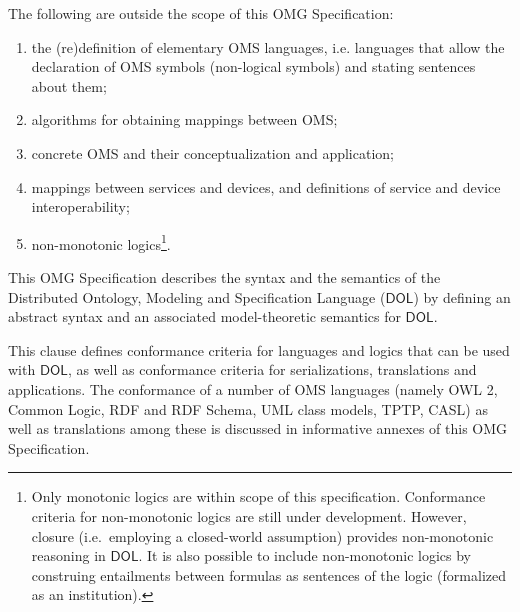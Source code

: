 \documentclass[10pt, a4paper]{isov2}
\makeatletter
\newcommand*{\ie}{i.e.\@\xspace}
\newcommand*\CommentAuthor{}
\renewcommand*\CommentAuthor{#1}}
\newcommand*\CommentDate{}
\renewcommand*\CommentDate{#1}}
\newcommand*\CommentId{}
\renewcommand*\CommentId{#1}}
\newcommand*\CommentType{}
\renewcommand*\CommentType{#1}}
\newcommand*{\SetCommentColorByType}[1]{%
\edef\localType{{#1}}%
\expandafter\ifstrequal\localType{q-aut}{\colorlet{CommentColor}{red}}{%
\expandafter\ifstrequal\localType{q-all}{\colorlet{CommentColor}{orange}}{%
\expandafter\ifstrequal\localType{todo}{\colorlet{CommentColor}{orange}}{%
\expandafter\ifstrequal\localType{fyi}{\colorlet{CommentColor}{lightgray}}{%
\colorlet{CommentColor}{yellow}}}}}}
\newcommand*{\SetCommentPrefixByType}[1]{%
\edef\localType{{#1}}%
\expandafter\@ifmtarg\localType{%
\edef\CommentPrefix{}%
}{%
\caseupper[q]{#1}%
\edef\CommentPrefix{\thestring: }%
}}
\newcommand*{\initComment}[1]{%
\setkeys{Comment}{#1}%
\SetCommentColorByType{\CommentType}%
\relax%
\SetCommentPrefixByType{\CommentType}%
\relax%
}
\newcommand*{\todonote}[2][]{%
\initComment{#1}%
\pdfcomment[author=\CommentAuthor,color=CommentColor,date=\CommentDate,id=\CommentId]{%
\CommentPrefix
#2}}
\renewcommand*{\todonote}[2][]{%
\initComment{#1}%
\ednote{\CommentPrefix #2}}
\newcommand*{\IS}{OMG Specification\xspace}
\newcommand*{\DOL}{\ensuremath{\mathsf{DOL}}\xspace}
\makeatother
\begin{document}
The following are outside the scope of this \IS:
\begin{enumerate}
\item the (re)definition of elementary OMS languages, \ie languages that allow the declaration of OMS symbols (non-logical symbols) 
and
stating sentences about them;
\item algorithms for obtaining mappings between OMS;
\item concrete OMS and their conceptualization and application;
\item mappings between services and devices, and definitions of service and device interoperability;
\item non-monotonic logics\footnote{Only monotonic logics are within scope of this specification. Conformance criteria for non-monotonic logics are still under development. However, closure (i.e.\ employing a closed-world assumption) provides non-monotonic reasoning in \DOL. It is also possible to include non-monotonic logics by construing entailments between formulas as sentences of the logic (formalized as an institution).}. 

\end{enumerate}

This \IS describes the syntax and the semantics of the Distributed Ontology, Modeling and
Specification Language (\DOL) by defining an abstract syntax and an associated model-theoretic
semantics for \DOL. 


\cleardoublepage
{}\label{c:conformance}
This clause defines conformance criteria for languages and logics that can be used with \DOL, as well as conformance criteria for
serializations, translations and applications. The conformance of a
number of OMS languages (namely OWL 2, Common Logic, RDF and RDF Schema, 
UML class models, TPTP, CASL) as well as translations among
these is discussed in informative annexes of this \IS.
\end{document}
